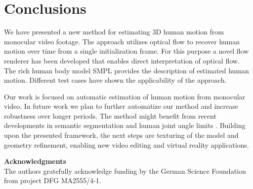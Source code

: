 \documentclass[10pt,twocolumn,letterpaper]{article}
\begin{document}
\section{Conclusions}	

We have presented a new method for estimating 3D human motion from monocular video footage. The approach utilizes optical flow to recover human motion over time from a single initialization frame. For this purpose a novel flow renderer has been developed that enables direct interpretation of optical flow. The rich human body model SMPL provides the description of estimated human motion. Different test cases have shown the applicability of the approach.

Our work is focused on automatic estimation of human motion from monocular video. In future work we plan to further automatize our method and increase robustness over longer periods. The method might benefit from recent developments in semantic segmentation \cite{oliveira2016deep} and human joint angle limits \cite{akhter2015poseconditioned}. Building upon the presented framework, the next steps are texturing of the model and geometry refinement, enabling new video editing and virtual reality applications.

\hspace{2mm}

\noindent
\begin{minipage}{\linewidth}
\textbf{Acknowledgments}\\
The authors gratefully acknowledge funding by the German Science Foundation from project DFG MA2555/4-1.
\end{minipage}


%
%


\end{document}
